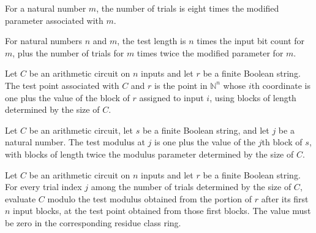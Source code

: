 \begin{definition}
\label{Randomized.numTrials}
\leanok
{}
For a natural number $m$, the number of trials is eight times the modified parameter
associated with $m$.
\end{definition}

\begin{definition}
\label{Randomized.testLen}
\leanok
{}
For natural numbers $n$ and $m$, the test length is $n$ times the input bit count for
$m$, plus the number of trials for $m$ times twice the modified parameter for $m$.
\end{definition}

\begin{definition}
\label{Randomized.AlgCircuit.testPoint}
\leanok
{}
Let $C$ be an arithmetic circuit on $n$ inputs and let $r$ be a finite Boolean string.
The test point associated with $C$ and $r$ is the point in $\mathbb N^n$ whose $i$th
coordinate is one plus the value of the block of $r$ assigned to input $i$, using blocks
of length determined by the size of $C$.
\end{definition}

\begin{definition}
\label{Randomized.AlgCircuit.testModulus}
\leanok
{}
Let $C$ be an arithmetic circuit, let $s$ be a finite Boolean string, and let $j$ be a
natural number. The test modulus at $j$ is one plus the value of the $j$th block of $s$,
with blocks of length twice the modulus parameter determined by the size of $C$.
\end{definition}

\begin{definition}
\label{Randomized.AlgCircuit.ZeroTestCore}
\leanok
{}
Let $C$ be an arithmetic circuit on $n$ inputs and let $r$ be a finite Boolean string.
For every trial index $j$ among the number of trials determined by the size of $C$,
evaluate $C$ modulo the test modulus obtained from the portion of $r$ after its first
$n$ input blocks, at the test point obtained from those first blocks. The value must be
zero in the corresponding residue class ring.
\end{definition}

